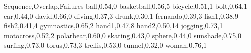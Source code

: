 Sequence,Overlap,Failures
ball,0.54,0
basketball,0.56,5
bicycle,0.51,1
bolt,0.64,1
car,0.44,0
david,0.66,0
diving,0.37,3
drunk,0.30,1
fernando,0.39,3
fish1,0.38,9
fish2,0.41,4
gymnastics,0.65,2
hand1,0.47,8
hand2,0.50,14
jogging,0.73,1
motocross,0.52,2
polarbear,0.60,0
skating,0.43,0
sphere,0.44,0
sunshade,0.75,0
surfing,0.73,0
torus,0.73,3
trellis,0.53,0
tunnel,0.32,0
woman,0.76,1